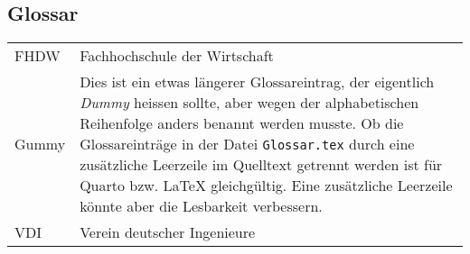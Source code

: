 \subsection*{Glossar}
\begingroup
\renewcommand{\arraystretch}{1.5}
\begin{tabularx}{\textwidth}{lX}

FHDW & Fachhochschule der Wirtschaft \\
Gummy & Dies ist ein etwas längerer Glossareintrag, der eigentlich \textit{Dummy} heissen sollte, aber wegen der alphabetischen Reihenfolge anders benannt werden musste. Ob die Glossareinträge in der Datei \texttt{Glossar.tex} durch eine zusätzliche Leerzeile im Quelltext getrennt werden ist für Quarto bzw. \LaTeX{} gleichgültig. Eine zusätzliche Leerzeile könnte aber die Lesbarkeit verbessern.\\

VDI & Verein deutscher Ingenieure \\

\end{tabularx}
\endgroup
\newpage
\fancyhead[L]{\slshape\nouppercase\leftmark}